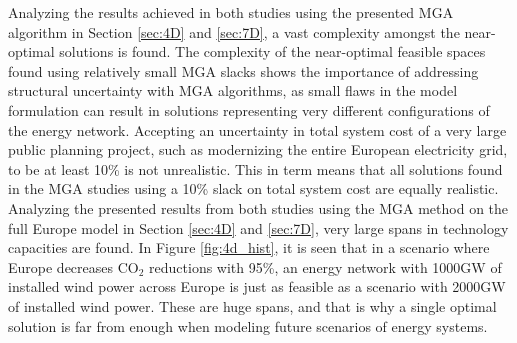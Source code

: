 Analyzing the results achieved in both studies using the presented MGA algorithm in Section \ref{sec:4D} and \ref{sec:7D}, a vast complexity amongst the near-optimal solutions is found. The complexity of the near-optimal feasible spaces found using relatively small MGA slacks shows the importance of addressing structural uncertainty with MGA algorithms, as small flaws in the model formulation can result in solutions representing very different configurations of the energy network. 
Accepting an uncertainty in total system cost of a very large public planning project, such as modernizing the entire European electricity grid, to be at least 10\% is not unrealistic. This in term means that all solutions found in the MGA studies using a 10\% slack on total system cost are equally realistic. Analyzing the presented results from both studies using the MGA method on the full Europe model in Section \ref{sec:4D} and \ref{sec:7D}, very large spans in technology capacities are found. In Figure \ref{fig:4d_hist}, it is seen that in a scenario where Europe decreases $\text{CO}_2$ reductions with 95\%, an energy network with 1000GW of installed wind power across Europe is just as feasible as a scenario with 2000GW of installed wind power. These are huge spans, and that is why a single optimal solution is far from enough when modeling future scenarios of energy systems. 

